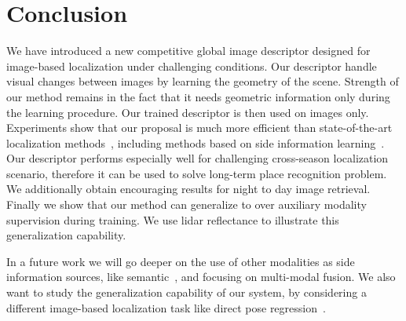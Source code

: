 \section{Conclusion}
\label{sec:conclusion}

We have introduced a new competitive global image descriptor designed for image-based localization under challenging conditions. Our descriptor handle visual changes between images by learning the geometry of the scene. Strength of our method remains in the fact that it needs geometric information only during the learning procedure. Our trained descriptor is then used on images only. Experiments show that our proposal is much more efficient than state-of-the-art localization methods~\cite{Arandjelovic2017, Radenovic2017}, including methods based on side information learning~\cite{Hoffman2016}. Our descriptor performs especially well for challenging cross-season localization scenario, therefore it can be used to solve long-term place recognition problem. We additionally obtain encouraging results for night to day image retrieval. Finally we show that our method can generalize to over auxiliary modality supervision during training. We use lidar reflectance to illustrate this generalization capability.

In a future work we will go deeper on the use of other modalities as side information sources, like semantic~\cite{Seymour2018}, and focusing on multi-modal fusion. We also want to study the generalization capability of our system, by considering a different image-based localization task like direct pose regression~\cite{Brachmann2017b}.